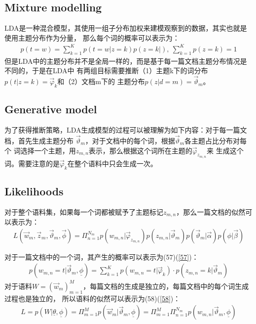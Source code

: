 \documentclass[UTF8]{ctexart}
\begin{document}
\subsection{Mixture modelling}
LDA是一种混合模型，其使用一组子分布加权来建模观察到的数据，其实也就是使用主题分布作为分量，
那么每个词的概率可以表示为：
\begin{align}
p(t=w) = \sum_{k=1}^K p(t=w|z=k)p(z=k|), \ \sum_{k=1}^K p(z=k) = 1
\end{align}
但是LDA中的主题分布并不是全局一样的，而是基于每一篇文档主题分布情况是不同的，于是在LDA中
有两组目标需要推断（1）主题k下的词分布$p(t|z=k)=\vec{\varphi}_k$和（2）文档m下的
主题分布$p(z|d=m)=\vec{\vartheta}_m$。

\subsection{Generative model}
为了获得推断策略，LDA生成模型的过程可以被理解为如下内容：对于每一篇文档，首先生成主题分布
$\vec{\vartheta}_m$，对于文档中的每个词，根据$\vec{\vartheta}_m$各主题占比分布对每个
词选择一个主题，用$z_{m,n}$表示，那么根据这个词所在主题的$\vec{\varphi}_{z_{m,n}}$来
生成这个词。需要注意的是$\vec{\varphi}_k$在整个语料中只会生成一次。

\subsection{Likelihoods}
对于整个语料集，如果每一个词都被赋予了主题标记$z_{m,n}$，那么一篇文档的似然可以表示为：
\begin{align}
L(\vec{w}_m, \vec{z}_m, \vec{\vartheta}_m, \vec{\phi}) = \Pi_{n=1}^{N_m}
p(w_{m,n}|\vec{\varphi}_{z_{m,n}}) p(z_{m,n}|\vec{\vartheta}_m) p(\vec{\vartheta}_m|\vec{\alpha}) p(\phi|\vec{\beta})
\end{align}
\par
对于一篇文档中的一个词，其产生的概率可以表示为(57)(\ref{57})：
\begin{align}
\label{57}
p(w_{m,n}=t|\vec{\vartheta}_m, \underline{\phi}) = \sum_{k=1}^K
p(w_{m,n}=t|\vec{\varphi}_k) \cdot p(z_{m,n}=k|\vec{\vartheta}_m)
\end{align}
对于语料$W=(\vec{w}_m)_{m=1}^M$，每篇文档的生成是独立的，每篇文档中的每个词生成过程也是独立的，
所以语料的似然可以表示为(58)(\ref{58})：
\begin{align}
\label{58}
L = p(W|\underline{\theta}, \underline{\phi}) = \Pi_{m=1}^M 
p(\vec{w}_m|\vec{\vartheta}_m, \underline{\phi}) = \Pi_{m=1}^M \Pi_{n=1}^{N_m}
p(w_{m,n}|\vec{\vartheta}_m, \underline{\phi})
\end{align}
\end{document}
